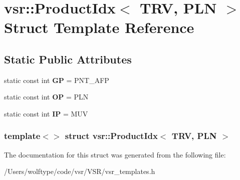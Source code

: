 \hypertarget{structvsr_1_1_product_idx_3_01_t_r_v_00_01_p_l_n_01_4}{\section{vsr\-:\-:Product\-Idx$<$ T\-R\-V, P\-L\-N $>$ Struct Template Reference}
\label{structvsr_1_1_product_idx_3_01_t_r_v_00_01_p_l_n_01_4}
}
\subsection*{Static Public Attributes}
\begin{DoxyCompactItemize}
\item 
\hypertarget{structvsr_1_1_product_idx_3_01_t_r_v_00_01_p_l_n_01_4_aa9ce14b3318eaf7481f0d832568528fd}{static const int {\bfseries G\-P} = P\-N\-T\-\_\-\-A\-F\-P}\label{structvsr_1_1_product_idx_3_01_t_r_v_00_01_p_l_n_01_4_aa9ce14b3318eaf7481f0d832568528fd}

\item 
\hypertarget{structvsr_1_1_product_idx_3_01_t_r_v_00_01_p_l_n_01_4_a94908ad01e79eaa8ff7b4401f743ff30}{static const int {\bfseries O\-P} = P\-L\-N}\label{structvsr_1_1_product_idx_3_01_t_r_v_00_01_p_l_n_01_4_a94908ad01e79eaa8ff7b4401f743ff30}

\item 
\hypertarget{structvsr_1_1_product_idx_3_01_t_r_v_00_01_p_l_n_01_4_a61879ad88ecaaba14ec3dd60f4b426fe}{static const int {\bfseries I\-P} = M\-U\-V}\label{structvsr_1_1_product_idx_3_01_t_r_v_00_01_p_l_n_01_4_a61879ad88ecaaba14ec3dd60f4b426fe}

\end{DoxyCompactItemize}
\subsubsection*{template$<$$>$ struct vsr\-::\-Product\-Idx$<$ T\-R\-V, P\-L\-N $>$}



The documentation for this struct was generated from the following file\-:\begin{DoxyCompactItemize}
\item 
/\-Users/wolftype/code/vsr/\-V\-S\-R/vsr\-\_\-templates.\-h\end{DoxyCompactItemize}
